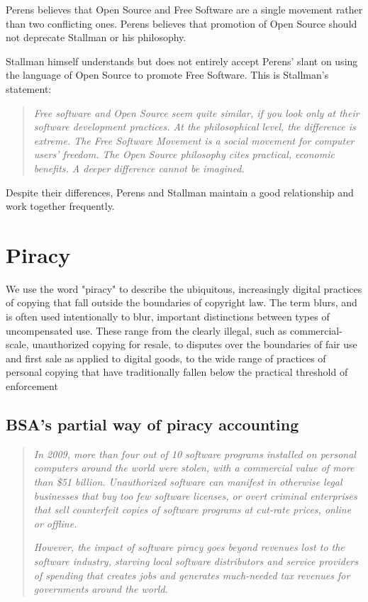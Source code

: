 \documentclass[times, utf8, seminar]{fit}
\begin{document}
Perens believes that Open Source and Free Software are a single movement rather than two conflicting ones. Perens believes that promotion of Open Source should not deprecate Stallman or his philosophy.

Stallman himself understands but does not entirely accept Perens' slant on using the language of Open Source to promote Free Software. This is Stallman's statement:

\begin{quotation}
\emph{Free software and Open Source seem quite similar, if you look only at their software development practices. At the philosophical level, the difference is extreme. The Free Software Movement is a social movement for computer users' freedom. The Open Source philosophy cites practical, economic benefits. A deeper difference cannot be imagined.}
\end{quotation}

Despite their differences, Perens and Stallman maintain a good relationship and work together frequently.
\section{Piracy}

We use the word "piracy" to describe the ubiquitous, increasingly digital practices of copying that fall outside the boundaries of copyright law. The term blurs, and is often used intentionally to blur, important distinctions between types of uncompensated use. These range from the clearly illegal, such as commercial-scale, unauthorized copying for resale, to disputes over the boundaries of fair use and first sale as applied to digital goods, to the wide range of practices of personal copying that have traditionally fallen below the practical threshold of enforcement\citep{mediapiracy}


\subsection{BSA's partial way of piracy accounting}


\begin{quotation}
\emph{In 2009, more than four out of 10 software programs installed on personal computers around the world were stolen, with a commercial value of more than \$51 billion. Unauthorized software can manifest in otherwise legal businesses that buy too few software licenses, or overt criminal enterprises that sell counterfeit copies of software programs at cut-rate prices, online or offline.}

\emph{However, the impact of software piracy goes beyond revenues lost to the software industry, starving local software distributors and service providers of spending that creates jobs and generates much-needed tax revenues for governments around the world.}\citep{bsapiracyimpact}
\end{quotation}\\
\end{document}
